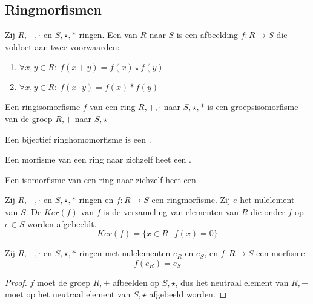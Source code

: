 \documentclass[main.tex]{subfiles}
\begin{document}
\subsection{Ringmorfismen}
\label{sec:ringmorfismen}

\begin{de}
  Zij $R,+,\cdot$ en $S,\star,*$ ringen.
  Een  van $R$ naar $S$ is een afbeelding $f: R\rightarrow S$ die voldoet aan twee voorwaarden:
  \begin{enumerate}
  \item $\forall x,y \in R:\ f(x + y) = f(x) \star f(y)$
  \item $\forall x,y \in R:\ f(x \cdot y) = f(x) * f(y)$
  \end{enumerate}
\end{de}

\begin{opm}
  Een ringisomorfisme $f$ van een ring $R,+,\cdot$ naar $S,\star,*$ is een groepsisomorfisme van de groep $R,+$ naar $S,\star$
\end{opm}

\begin{de}
  Een bijectief ringhomomorfisme is een .
\end{de}

\begin{de}
  Een morfisme van een ring naar zichzelf heet een .
\end{de}

\begin{de}
  Een isomorfisme van een ring naar zichzelf heet een .
\end{de}

\begin{de}
  Zij $R,+,\cdot$ en $S,\star,*$ ringen en $f:R \rightarrow S$ een ringmorfisme.
  Zij $e$ het nulelement van $S$.
  De  $Ker(f)$ van $f$ is de verzameling van elementen van $R$ die onder $f$ op $e\in S$ worden afgebeeldt.
  \[ Ker(f) = \{ x \in R \ |\ f(x) = 0 \} \]
\end{de}

\begin{ei}
  Zij $R,+,\cdot$ en $S,\star,*$ ringen met nulelementen $e_{R}$ en $e_{S}$, en $f:R \rightarrow S$ een morfisme.
  \[ f(e_{R}) = e_{S} \]

  \begin{proof}
    $f$ moet de groep $R,+$ afbeelden op $S,\star$, dus het neutraal element van $R,+$ moet op het neutraal element van $S,\star$ afgebeeld worden.
  \end{proof}
\end{ei}
 
\end{document}
